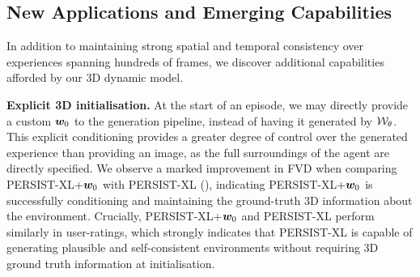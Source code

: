 \documentclass{article}
\theoremstyle{plain}
\theoremstyle{definition}
\theoremstyle{remark}
\begin{document}



\subsection{New Applications and Emerging Capabilities}

In addition to maintaining strong spatial and temporal consistency over experiences spanning hundreds of frames, we discover additional capabilities afforded by our 3D dynamic model.

\textbf{Explicit 3D initialisation.} At the start of an episode, we may directly provide a custom ${\bm{w}}_0$ to the generation pipeline, instead of having it generated by ${\mathcal{W}}_\theta$. This explicit conditioning provides a greater degree of control over the generated experience than providing an image, as the full surroundings of the agent are directly specified. We observe a marked improvement in FVD when comparing PERSIST-XL+${\bm{w}}_0$ with PERSIST-XL (), indicating PERSIST-XL+${\bm{w}}_0$ is successfully conditioning and maintaining the ground-truth 3D information about the environment. Crucially, PERSIST-XL+${\bm{w}}_0$ and PERSIST-XL perform similarly in user-ratings, which strongly indicates that PERSIST-XL is capable of generating plausible and self-consistent environments without requiring 3D ground truth information at initialisation.

\end{document}
